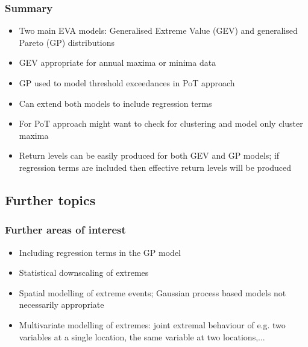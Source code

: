 \documentclass[dvipsnames]{beamer}
\begin{document}
\begin{frame}
\frametitle{Summary}
\begin{itemize}
\item
Two main EVA models: Generalised Extreme Value (GEV) and generalised Pareto (GP) distributions
\item
GEV appropriate for annual maxima or minima data
\item
GP used to model threshold exceedances in PoT approach
\item
Can extend both models to include regression terms
\item
For PoT approach might want to check for clustering and model only cluster maxima
\item
Return levels can be easily produced for both GEV and GP models; if regression terms are included then effective return levels will be produced
\end{itemize}
\end{frame}

\subsection{Further topics}

\begin{frame}
\frametitle{Further areas of interest}
\begin{itemize}
\item
Including regression terms in the GP model
\item
Statistical downscaling of extremes
\item
Spatial modelling of extreme events; Gaussian process based models not necessarily appropriate
\item
Multivariate modelling of extremes: joint extremal behaviour of e.g. two variables at a single location, the same variable at two locations,...
\end{itemize}
\end{frame}
\end{document}
